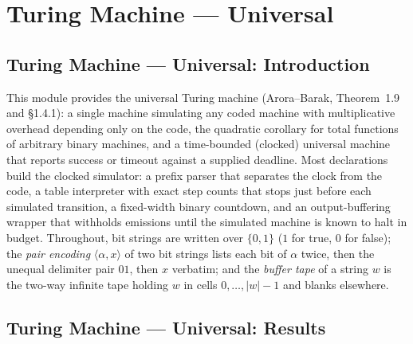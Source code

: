 \section{Turing Machine --- Universal}
\subsection*{Turing Machine --- Universal: Introduction}

This module provides the universal Turing machine (Arora--Barak, Theorem~1.9
and \S 1.4.1): a single machine simulating any coded machine with
multiplicative overhead depending only on the code, the quadratic corollary
for total functions of arbitrary binary machines, and a time-bounded
(clocked) universal machine that reports success or timeout against a supplied
deadline.  Most declarations build the clocked simulator: a prefix parser that
separates the clock from the code, a table interpreter with exact step counts
that stops just before each simulated transition, a fixed-width binary
countdown, and an output-buffering wrapper that withholds emissions until the
simulated machine is known to halt in budget.  Throughout, bit strings are
written over $\{0,1\}$ ($1$ for true, $0$ for false); the \emph{pair encoding}
$\langle \alpha, x\rangle$ of two bit strings lists each bit of $\alpha$
twice, then the unequal delimiter pair $01$, then $x$ verbatim; and the
\emph{buffer tape} of a string $w$ is the two-way infinite tape holding $w$ in
cells $0,\dots,|w|-1$ and blanks elsewhere.

\subsection*{Turing Machine --- Universal: Results}

